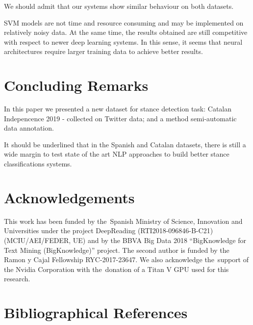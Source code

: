 \documentclass[10pt, a4paper]{article}
\begin{document}
We should admit that our systems show similar behaviour on both datasets.

SVM models are not time and resource consuming and may be implemented on relatively noisy data. At the same time, the results obtained are still competitive with respect to newer deep learning systems. In this sense, it seems that neural architectures require larger training data to achieve better results.





\section{Concluding Remarks}

In this paper we presented a new dataset for stance detection task: Catalan Indepencence 2019 - collected on Twitter data; and a method semi-automatic data annotation.

It should be underlined that in the Spanish and Catalan datasets, there is still a wide margin to test state of the art NLP approaches to build better stance classifications systems.

\section{Acknowledgements}\label{sec:acknoledgements}

This work has been funded by the~Spanish Ministry of Science, Innovation and Universities under the project DeepReading (RTI2018-096846-B-C21) (MCIU/AEI/FEDER, UE) and by the BBVA Big Data 2018 ``BigKnowledge for Text Mining (BigKnowledge)'' project. The second author is funded by the Ramon y Cajal Fellowship RYC-2017-23647. We also acknowledge the~support of the Nvidia Corporation with the~donation of a Titan V GPU used for this research.

\section{Bibliographical References}\label{main:ref}





\end{document}

